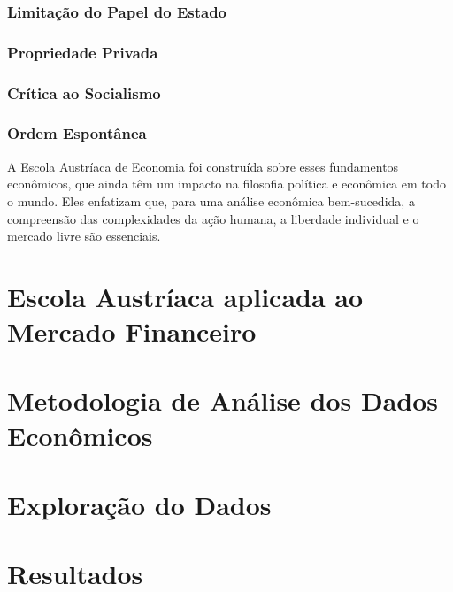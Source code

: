 \documentclass[a4paper,12pt]{article}
\begin{document}
\subsubsection{Limitação do Papel do Estado}
\subsubsection{Propriedade Privada}
\subsubsection{Crítica ao Socialismo }
\subsubsection{Ordem Espontânea}

\hspace{0.5cm}A Escola Austríaca de Economia foi construída sobre esses fundamentos econômicos, que ainda têm um impacto 
na filosofia política e econômica em todo o mundo. Eles enfatizam que, para uma análise econômica bem-sucedida,
a compreensão das complexidades da ação humana, a liberdade individual e o mercado livre são essenciais.

\section{Escola Austr\'iaca aplicada ao Mercado Financeiro}

\section{Metodologia de An\'alise dos Dados Econ\^omicos}

\section{Explora\c{c}\~ao do Dados}

\section{Resultados}
\end{document}
